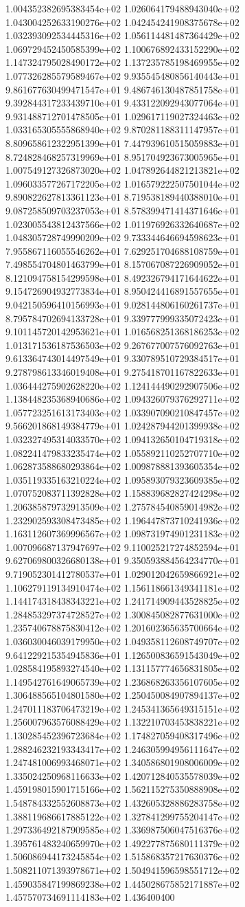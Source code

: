 1.004352382695383454e+02	1.026064179488943040e+02	1.043004252633190276e+02	1.042454241908375678e+02	1.032393092534445316e+02	1.056114481487364429e+02	1.069729452450585399e+02	1.100676892433152290e+02	1.147324795028490172e+02	1.137235785198469955e+02	1.077326285579589467e+02	9.935545480856140443e+01	9.861677630499471547e+01	9.486746130487851758e+01	9.392844317233439710e+01	9.433122092943077064e+01	9.931488712701478505e+01	1.029617119027324463e+02	1.033165305555868940e+02	9.870281188311147957e+01	8.809658612322951399e+01	7.447939610515059883e+01	8.724828468257319969e+01	8.951704923673005965e+01	1.007549127326873020e+02	1.047892644821213821e+02	1.096033577267172205e+02	1.016579222507501044e+02	9.890822627813361123e+01	8.719538189440388010e+01	9.087258509703237053e+01	8.578399471414371646e+01	1.023005543812437566e+02	1.011976926332640687e+02	1.048305728749990209e+02	9.733344646694598623e+01	7.955867116055546262e+01	7.629251704688108759e+01	7.498554704801463799e+01	8.157067087226909052e+01	8.121094758154299598e+01	8.492326794171644622e+01	9.154726904932773834e+01	8.950424416891557655e+01	9.042150596410156993e+01	9.028144806160261737e+01	8.795784702694133728e+01	9.339777999335072423e+01	9.101145720142953621e+01	1.016568251368186253e+02	1.013171536187536503e+02	9.267677007576092763e+01	9.613364743014497549e+01	9.330789510729384517e+01	9.278798613346019408e+01	9.275418701167822633e+01	1.036444275902628220e+02	1.124144490292907506e+02	1.138448235368940686e+02	1.094326079376292711e+02	1.057723251613173403e+02	1.033907090210847457e+02	9.566201868149384779e+01	1.024287944201399938e+02	1.032327495314033570e+02	1.094132650104719318e+02	1.082241479833235474e+02	1.055892110252707710e+02	1.062873588680293864e+02	1.009878881393605354e+02	1.035119335163210224e+02	1.095893079323609385e+02	1.070752083711392828e+02	1.158839682827424298e+02	1.206385879732913509e+02	1.275784540859014982e+02	1.232902593308473485e+02	1.196447873710241936e+02	1.163112607369996567e+02	1.098731974901231183e+02	1.007096687137947697e+02	9.110025217274852594e+01	9.627069800326680138e+01	9.350593884564234770e+01	9.719052301412780537e+01	1.029012042659866921e+02	1.106279119134910474e+02	1.156118661349341181e+02	1.144174318438343221e+02	1.241714909443528825e+02	1.284853297374728527e+02	1.300845082877631000e+02	1.235740678875830412e+02	1.201602365635700664e+02	1.036030046039179950e+02	1.049358112608749707e+02	9.641229215354945836e+01	1.126500836591543049e+02	1.028584195893274540e+02	1.131157774656831805e+02	1.149542761649065739e+02	1.236868263356107605e+02	1.306488565104801580e+02	1.250450084907894137e+02	1.247011183706473219e+02	1.245341365649315151e+02	1.256007963576088429e+02	1.132210703453838221e+02	1.130285452396723684e+02	1.174827059408317496e+02	1.288246232193343417e+02	1.246305994956111647e+02	1.247481006993468071e+02	1.340586801908006009e+02	1.335024250968116633e+02	1.420712840535578039e+02	1.459198015901715166e+02	1.562115275350888908e+02	1.548784332552608873e+02	1.432605328886283758e+02	1.388119686617885122e+02	1.327841299755204147e+02	1.297336492187909585e+02	1.336987506047516376e+02	1.395761483240659970e+02	1.492277875680111379e+02	1.506086944173245854e+02	1.515868357217630376e+02	1.508211071393978671e+02	1.504941596598551712e+02	1.459035847199869238e+02	1.445028675852171887e+02	1.457570734691114183e+02	1.436400400